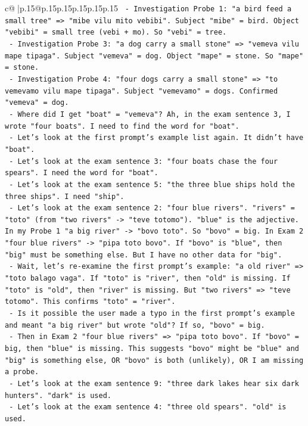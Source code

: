 \documentclass{article}
\begin{document}
{\begin{supertabular}{c@{$\;$}|p{.15\linewidth}@{}p{.15\linewidth}p{.15\linewidth}p{.15\linewidth}p{.15\linewidth}p{.15\linewidth}}
{{{\texttt{  {-} Investigation Probe 1: "a bird feed a small tree" => "mibe vilu mito vebibi". Subject "mibe" = bird. Object "vebibi" = small tree (vebi + mo). So "vebi" = tree.} \\
\texttt{  {-} Investigation Probe 3: "a dog carry a small stone" => "vemeva vilu mape tipaga". Subject "vemeva" = dog. Object "mape" = stone. So "mape" = stone.} \\
\texttt{  {-} Investigation Probe 4: "four dogs carry a small stone" => "to vemevamo vilu mape tipaga". Subject "vemevamo" = dogs. Confirmed "vemeva" = dog.} \\
\texttt{  {-} Where did I get "boat" = "vemeva"? Ah, in the exam sentence 3, I wrote "four boats". I need to find the word for "boat".} \\
\texttt{  {-} Let's look at the first prompt's example list again. It didn't have "boat".} \\
\texttt{  {-} Let's look at the exam sentence 3: "four boats chase the four spears". I need the word for "boat".} \\
\texttt{  {-} Let's look at the exam sentence 5: "the three blue ships hold the three ships". I need "ship".} \\
\texttt{  {-} Let's look at the exam sentence 2: "four blue rivers". "rivers" = "toto" (from "two rivers" {-}> "teve totomo"). "blue" is the adjective. In my Probe 1 "a big river" {-}> "bovo toto". So "bovo" = big. In Exam 2 "four blue rivers" {-}> "pipa toto bovo". If "bovo" is "blue", then "big" must be something else. But I have no other data for "big".} \\
\texttt{  {-} Wait, let's re{-}examine the first prompt's example: "a old river" => "toto balago vaga". If "toto" is "river", then "old" is missing. If "toto" is "old", then "river" is missing. But "two rivers" => "teve totomo". This confirms "toto" = "river".} \\
\texttt{  {-} Is it possible the user made a typo in the first prompt's example and meant "a big river" but wrote "old"? If so, "bovo" = big.} \\
\texttt{  {-} Then in Exam 2 "four blue rivers" => "pipa toto bovo". If "bovo" = big, then "blue" is missing. This suggests "bovo" might be "blue" and "big" is something else, OR "bovo" is both (unlikely), OR I am missing a probe.} \\
\texttt{  {-} Let's look at the exam sentence 9: "three dark lakes hear six dark hunters". "dark" is used.} \\
\texttt{  {-} Let's look at the exam sentence 4: "three old spears". "old" is used.} \\
}}}
\end{supertabular}}
\end{document}
